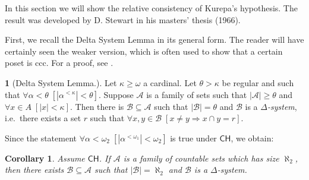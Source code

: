 \documentclass[11pt,a4paper]{report}
\newtheorem{corollary}[theorem]{Corollary} %
\theoremstyle{definition}
\theoremstyle{num.custom-title}
\newtheorem{teo_custom-title}[theorem]{} %
\theoremstyle{custom-title}
\DeclareMathOperator{\imp}{\Rightarrow}
\DeclareMathOperator{\sse}{\subseteq}
\newcommand{\CH}{\ensuremath{\mathsf{CH}}\xspace}
\newcommand{\A}{\mathcal{A}}
\newcommand{\B}{\mathcal{B}}
\begin{document}
In this section we will show the relative consistency of Kurepa's hypothesis. The result was developed by D. Stewart \cite{Ste1966} in his masters' thesis (1966).

First, we recall the Delta System Lemma in its general form. The reader will have certainly seen the weaker version, which is often used to show that a certain poset is ccc. For a proof, see \cite{Kun1980}.

\begin{teo_custom-title}[Delta System Lemma.] \label{thm-delta_system_lemma}
Let $\kappa \geq \omega$ a cardinal. Let $\theta > \kappa$ be regular and such that $\forall \alpha < \theta \; [ |\alpha^{< \kappa}| < \theta]$. Suppose $\A$ is a family of sets such that $|\A| \geq \theta$ and $\forall x \in A \; [|x| < \kappa]$. Then there is $\B \sse \A$ such that $|\B| = \theta$ and $\B$ is a \emph{$\Delta$-system}, i.e.\ there exists a set $r$ such that $\forall x,y \in \B \; [x \neq y \imp x \cap y = r]$.
\end{teo_custom-title}

Since the statement $\forall \alpha < \omega_2 \; [|\alpha^{< \omega_1}| < \omega_2]$ is true under \CH, we obtain:

\begin{corollary}\label{corollary-delta_system_lemma_aleph2}
Assume \CH. If $\A$ is a family of countable sets which has size $\aleph_2$, then there exists $\B \sse \A$ such that $|\B| = \aleph_2$ and $\B$ is a $\Delta$-system.
\end{corollary}
\end{document}
